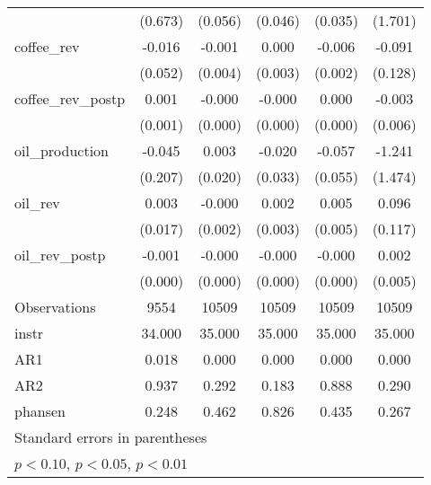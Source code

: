 \begin{table}[htbp]
\begin{tabular}{l*{5}{c}}
                &  (0.673)         &  (0.056)         &  (0.046)         &  (0.035)         &  (1.701)         \\
[1em]
coffee\_rev      &   -0.016         &   -0.001         &    0.000         &   -0.006\sym{**} &   -0.091         \\
                &  (0.052)         &  (0.004)         &  (0.003)         &  (0.002)         &  (0.128)         \\
[1em]
coffee\_rev\_postp&    0.001         &   -0.000         &   -0.000         &    0.000\sym{**} &   -0.003         \\
                &  (0.001)         &  (0.000)         &  (0.000)         &  (0.000)         &  (0.006)         \\
[1em]
oil\_production  &   -0.045         &    0.003         &   -0.020         &   -0.057         &   -1.241         \\
                &  (0.207)         &  (0.020)         &  (0.033)         &  (0.055)         &  (1.474)         \\
[1em]
oil\_rev         &    0.003         &   -0.000         &    0.002         &    0.005         &    0.096         \\
                &  (0.017)         &  (0.002)         &  (0.003)         &  (0.005)         &  (0.117)         \\
[1em]
oil\_rev\_postp   &   -0.001         &   -0.000         &   -0.000         &   -0.000         &    0.002         \\
                &  (0.000)         &  (0.000)         &  (0.000)         &  (0.000)         &  (0.005)         \\
\hline
Observations    &     9554         &    10509         &    10509         &    10509         &    10509         \\
instr           &   34.000         &   35.000         &   35.000         &   35.000         &   35.000         \\
AR1             &    0.018         &    0.000         &    0.000         &    0.000         &    0.000         \\
AR2             &    0.937         &    0.292         &    0.183         &    0.888         &    0.290         \\
phansen         &    0.248         &    0.462         &    0.826         &    0.435         &    0.267         \\
\hline\hline
\multicolumn{6}{l}{\footnotesize Standard errors in parentheses}\\
\multicolumn{6}{l}{\footnotesize \sym{*} \(p<0.10\), \sym{**} \(p<0.05\), \sym{***} \(p<0.01\)}\\
\end{tabular}
\end{table}
